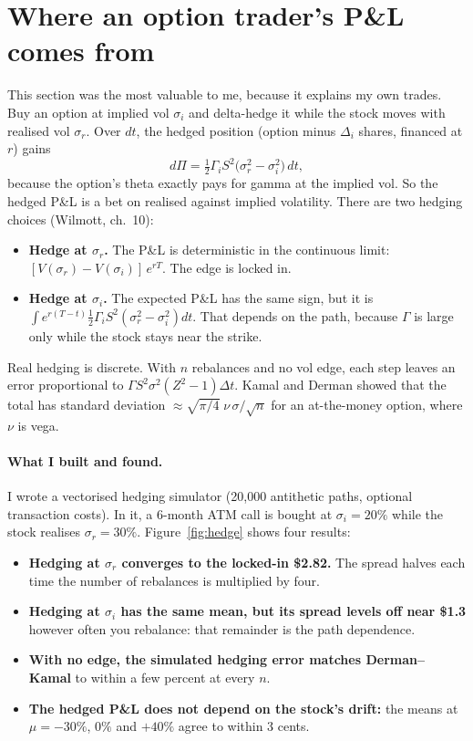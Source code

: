 \documentclass[11pt,a4paper]{article}
\begin{document}
\section{Where an option trader's P\&L comes from}
This section was the most valuable to me, because it explains my own trades. Buy an option at implied vol $\sigma_i$ and delta-hedge it while the stock moves with realised vol $\sigma_r$. Over $dt$, the hedged position (option minus $\Delta_i$ shares, financed at $r$) gains
\begin{equation}
d\Pi = \tfrac12\Gamma_i S^2\big(\sigma_r^2 - \sigma_i^2\big)\,dt ,
\end{equation}
because the option's theta exactly pays for gamma at the implied vol. So the hedged P\&L is a bet on realised against implied volatility. There are two hedging choices (Wilmott, ch.~10):
\begin{itemize}[leftmargin=1.5em]
  \item \textbf{Hedge at $\sigma_r$.} The P\&L is deterministic in the continuous limit: $[V(\sigma_r) - V(\sigma_i)]\,e^{rT}$. The edge is locked in.
  \item \textbf{Hedge at $\sigma_i$.} The expected P\&L has the same sign, but it is $\int e^{r(T-t)}\frac12\Gamma_iS^2(\sigma_r^2-\sigma_i^2)dt$. That depends on the path, because $\Gamma$ is large only while the stock stays near the strike.
\end{itemize}
Real hedging is discrete. With $n$ rebalances and no vol edge, each step leaves an error proportional to $\Gamma S^2\sigma^2(Z^2-1)\Delta t$. Kamal and Derman showed that the total has standard deviation $\approx \sqrt{\pi/4}\;\nu\,\sigma/\sqrt n$ for an at-the-money option, where $\nu$ is vega.

\paragraph{What I built and found.} I wrote a vectorised hedging simulator (20{,}000 antithetic paths, optional transaction costs). In it, a 6-month ATM call is bought at $\sigma_i=20\%$ while the stock realises $\sigma_r=30\%$. Figure~\ref{fig:hedge} shows four results:
\begin{itemize}[leftmargin=1.5em]
  \item \textbf{Hedging at $\sigma_r$ converges to the locked-in \$2.82.} The spread halves each time the number of rebalances is multiplied by four.
  \item \textbf{Hedging at $\sigma_i$ has the same mean, but its spread levels off near \$1.3} however often you rebalance: that remainder is the path dependence.
  \item \textbf{With no edge, the simulated hedging error matches Derman--Kamal} to within a few percent at every $n$.
  \item \textbf{The hedged P\&L does not depend on the stock's drift:} the means at $\mu = -30\%$, $0\%$ and $+40\%$ agree to within 3 cents.
\end{itemize}
\end{document}
